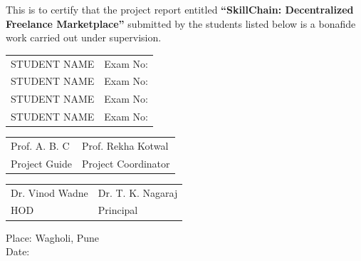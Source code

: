 \documentclass[12pt,a4paper]{report}
\begin{document}
This is to certify that the project report entitled \textbf{``SkillChain: Decentralized Freelance Marketplace''} submitted by the students listed below is a bonafide work carried out under supervision.

\vspace{1cm}

\begin{tabular}{ll}
STUDENT NAME & Exam No: \\
STUDENT NAME & Exam No: \\
STUDENT NAME & Exam No: \\
STUDENT NAME & Exam No: \\
\end{tabular}

\vspace{2cm}

\begin{tabular}{p{7cm} p{7cm}}
Prof. A. B. C & Prof. Rekha Kotwal \\
Project Guide & Project Coordinator \\
\end{tabular}

\vspace{2cm}

\begin{tabular}{p{7cm} p{7cm}}
Dr. Vinod Wadne & Dr. T. K. Nagaraj \\
HOD & Principal \\
\end{tabular}

\vspace{1cm}

Place: Wagholi, Pune \\
Date:
\end{document}
